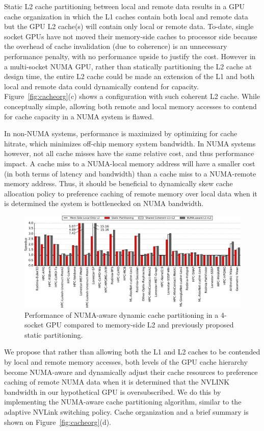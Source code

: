 Static L2 cache partitioning between local and remote data results in a GPU 
cache organization in which the L1 caches contain both local and remote data 
but the GPU L2 cache(s) will contain only local or remote data.  To-date, 
single socket GPUs have not moved their memory-side caches to processor side 
because the overhead of cache invalidation (due to coherence) is an 
unnecessary performance penalty, with no performance upside to justify the 
cost. However in a multi-socket NUMA GPU, rather than statically 
partitioning the L2 cache at design time, the entire L2 cache could be made 
an extension of the L1 and both local and remote data could dynamically 
contend for capacity. Figure~\ref{fig:cacheorg}(c) shows a configuration with 
such coherent L2 cache. While conceptually simple, allowing both remote and 
local memory accesses to contend for cache capacity in a NUMA system is flawed.

In non-NUMA systems, performance is maximized by optimizing for cache 
hitrate, which minimizes off-chip memory system bandwidth. In NUMA systems 
however, not all cache misses have the same relative cost, and thus 
performance impact. A cache miss to a NUMA-local memory address will have a 
smaller cost (in both terms of latency and bandwidth) than a cache miss to a 
NUMA-remote memory address. Thus, it should be beneficial to dynamically 
skew cache allocation policy to preference caching of remote memory over 
local data when it is determined the system is bottlenecked on NUMA bandwidth.


\begin{figure}[t]
    \centering
    \includegraphics[width=1.0\textwidth]{figures/plot_merged_cache_WB.pdf}
    \caption{Performance of NUMA-aware dynamic cache partitioning in a 4-socket
	GPU compared to memory-side L2 and previously proposed static partitioning.}
    \label{fig:dynamiccaching}
\end{figure}

We propose that rather than allowing both the L1 and L2 caches to be 
contended by local and remote memory accesses, both levels of the GPU cache 
hierarchy become NUMA-aware and dynamically adjust their cache resources to 
preference caching of remote NUMA data when it is determined that the NVLINK 
bandwidth in our hypothetical GPU is oversubscribed. We do this by 
implementing the NUMA-aware cache partitioning algorithm, similar to the 
adaptive NVLink switching policy. Cache organization and a brief summary is 
shown on Figure~\ref{fig:cacheorg}(d). 

